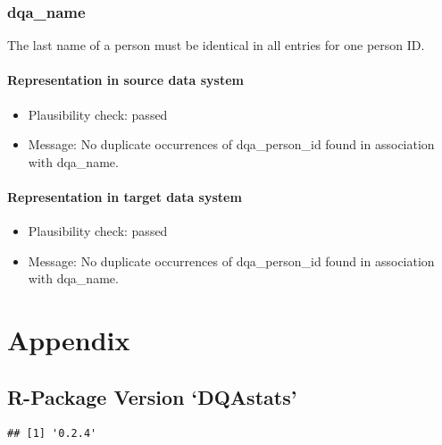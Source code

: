 \documentclass[
]{article}
\providecommand{\tightlist}{%
  \setlength{\itemsep}{0pt}\setlength{\parskip}{0pt}}
\begin{document}
\hypertarget{dqa_name}{%
\subsubsection{dqa\_name}\label{dqa_name}}

The last name of a person must be identical in all entries for one
person ID.

\hypertarget{representation-in-source-data-system-13}{%
\paragraph{Representation in source data
system}\label{representation-in-source-data-system-13}}

\begin{itemize}
\tightlist
\item
  Plausibility check: passed
\item
  Message: No duplicate occurrences of dqa\_person\_id found in
  association with dqa\_name.
\end{itemize}

\hypertarget{representation-in-target-data-system-13}{%
\paragraph{Representation in target data
system}\label{representation-in-target-data-system-13}}

\begin{itemize}
\tightlist
\item
  Plausibility check: passed
\item
  Message: No duplicate occurrences of dqa\_person\_id found in
  association with dqa\_name.
\end{itemize}

\newpage

\hypertarget{appendix}{%
\section{Appendix}\label{appendix}}

\hypertarget{r-package-version-dqastats}{%
\subsection{R-Package Version
`DQAstats'}\label{r-package-version-dqastats}}

\begin{verbatim}
## [1] '0.2.4'
\end{verbatim}
\end{document}
